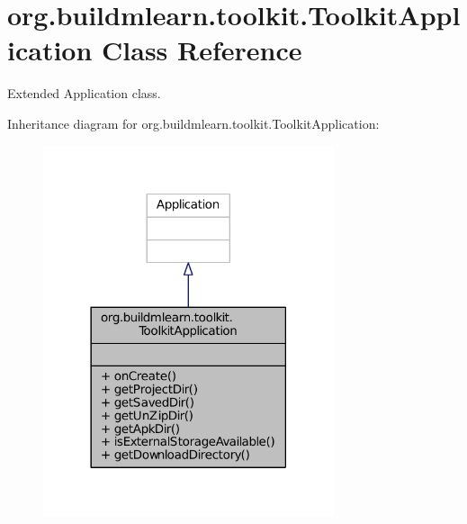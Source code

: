 \hypertarget{classorg_1_1buildmlearn_1_1toolkit_1_1ToolkitApplication}{\section{org.\-buildmlearn.\-toolkit.\-Toolkit\-Application Class Reference}
\label{classorg_1_1buildmlearn_1_1toolkit_1_1ToolkitApplication}
}


Extended Application class.  




Inheritance diagram for org.\-buildmlearn.\-toolkit.\-Toolkit\-Application\-:
\nopagebreak
\begin{figure}[H]
\begin{center}
\leavevmode
\includegraphics[width=242pt]{d8/de7/classorg_1_1buildmlearn_1_1toolkit_1_1ToolkitApplication__inherit__graph}
\end{center}
\end{figure}



